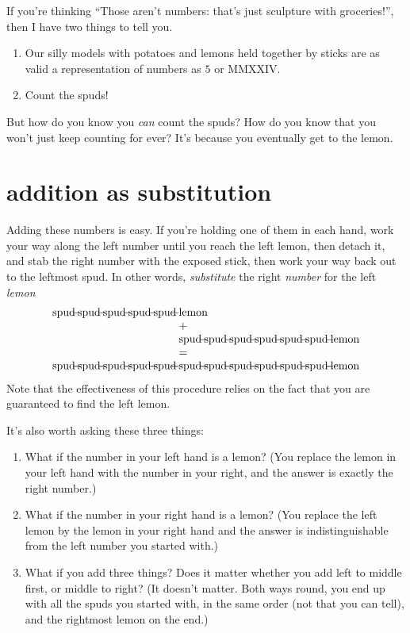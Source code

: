 \documentclass{book}
\begin{document}
If you're thinking ``Those aren't numbers: that's just sculpture with groceries!'', then I have two things to tell you.
\begin{enumerate}
\item Our silly models with potatoes and lemons held together by sticks are as valid a representation of numbers as $5$ or MMXXIV.
\item Count the spuds!
\end{enumerate}
But how do you know you \emph{can} count the spuds? How do you know that you won't just keep counting for ever? It's because you eventually get to the lemon.


\section{addition as substitution}

Adding these numbers is easy. If you're holding one of them in each hand, work your way along the left number until you reach the left lemon, then detach it, and stab the right number with the exposed stick, then work your way back out to the leftmost spud. In other words, \emph{substitute} the right \emph{number} for the left \emph{lemon}
\[\begin{array}{l@{\;\,}l}
\spud\spud\spud\spud\spud&\lemon\\
&+ \\
&\spud\spud\spud\spud\spud\spud\lemon\\
&= \\
\spud\spud\spud\spud\spud&\spud\spud\spud\spud\spud\spud\lemon\\
\end{array}
\]
Note that the effectiveness of this procedure relies on the fact that you are guaranteed to find the left lemon.

It's also worth asking these three things:
\begin{enumerate}
\item What if the number in your left hand is a lemon? (You replace the lemon in your left hand with the number in your right, and the answer is exactly the right number.)
\item What if the number in your right hand is a lemon? (You replace the left lemon by the lemon in your right hand and the answer is indistinguishable from the left number you started with.)
\item What if you add three things? Does it matter whether you add left to middle first, or middle to right? (It doesn't matter. Both ways round, you end up with all the spuds you started with, in the same order (not that you can tell), and the rightmost lemon on the end.)
\end{enumerate}
\end{document}

